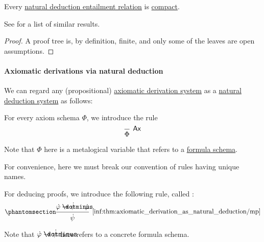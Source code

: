 \begin{proposition}\label{thm:propositional_natural_deduction_entailment_compact}
  Every \hyperref[def:natural_deduction_entailment]{natural deduction entailment relation} is \hyperref[def:consequence_relation/compactness]{compact}.
\end{proposition}
\begin{comments}
  \item See  for a list of similar results.
\end{comments}
\begin{proof}
  A proof tree is, by definition, finite, and only some of the leaves are open assumptions.
\end{proof}

\paragraph{Axiomatic derivations via natural deduction}

\begin{remark}\label{rem:axiomatic_derivation_system_as_natural_deduction_system}
  We can regard any (propositional) \hyperref[def:axiomatic_derivation_system]{axiomatic derivation system} as a \hyperref[def:abstract_natural_deduction_system]{natural deduction system} as follows:
  \begin{thmenum}
     For every axiom schema \( \Phi \), we introduce the rule
    \begin{equation*}
      \begin{prooftree}
        \infer0[\logic{Ax}]{ \Phi }
      \end{prooftree}
    \end{equation*}

    Note that \( \Phi \) here is a metalogical variable that refers to a \hyperref[def:propositional_formula_schema]{formula schema}.

    For convenience, here we must break our convention of rules having unique names.

     For deducing proofs, we introduce the following rule, called :
    \begin{equation*}\taglabel[\ensuremath{ \logic{MP} }]{inf:thm:axiomatic_derivation_as_natural_deduction/mp}
      \begin{prooftree}
        \hypo{ \syn\varphi \synimplies \syn\psi }
        \hypo{ \syn\varphi }
        \infer2[\ref{inf:thm:axiomatic_derivation_as_natural_deduction/mp}]{ \syn\psi }
      \end{prooftree}
    \end{equation*}

    Note that \( \syn\varphi \synimplies \syn\psi \) here refers to a concrete formula schema.
  \end{thmenum}
\end{remark}

